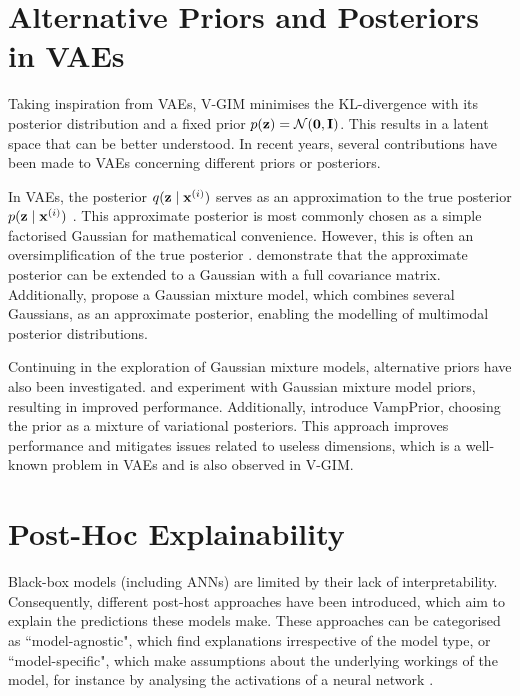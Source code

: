 	

\section{Alternative Priors and Posteriors in VAEs} \label{cha:rel_alt_priors}
	Taking inspiration from VAEs, V-GIM minimises the KL-divergence with its posterior distribution and a fixed prior $p(\mathbf{z})=\mathcal{N}(\bm{\mathbf{0}}, \mathbf{I})$. This results in a latent space that can be better understood. In recent years, several contributions have been made to VAEs concerning different priors or posteriors.
	
	In VAEs, the posterior $q (\mathbf{z} \mid \mathbf{x}^{(i)})$ serves as an approximation to the true posterior $p (\mathbf{z} \mid \mathbf{x}^{(i)})$ \citep{odaiboTutorialDerivingStandard2019}. This approximate posterior is most commonly chosen as a simple factorised Gaussian for mathematical convenience. However, this is often an oversimplification of the true posterior \citep{nalisnickApproximateInferenceDeep2016}. \cite{kingmaIntroductionVariationalAutoencoders2019} demonstrate that the approximate posterior can be extended to a Gaussian with a full covariance matrix. Additionally, \cite{nalisnickApproximateInferenceDeep2016} propose a Gaussian mixture model, which combines several Gaussians, as an approximate posterior, enabling the modelling of multimodal posterior distributions.
	
	Continuing in the exploration of Gaussian mixture models, alternative priors have also been investigated. \cite{guoVariationalAutoencoderOptimizing2020} and \cite{leeMetaGMVAEMixtureGaussian2021} experiment with Gaussian mixture model priors, resulting in improved performance. Additionally, \cite{tomczakVAEVampPrior2018} introduce VampPrior, choosing the prior as a mixture of variational posteriors. This approach improves performance and mitigates issues related to useless dimensions, which is a well-known problem in VAEs and is also observed in V-GIM.
	

\section{Post-Hoc Explainability}
Black-box models (including ANNs) are limited by their lack of interpretability. Consequently, different post-host approaches have been introduced, which aim to explain the predictions these models make. These approaches can be categorised as ``model-agnostic", which find explanations irrespective of the model type, or ``model-specific", which make assumptions about the underlying workings of the model, for instance by analysing the activations of a neural network \cite{barredoarrietaExplainableArtificialIntelligence2020a}.


